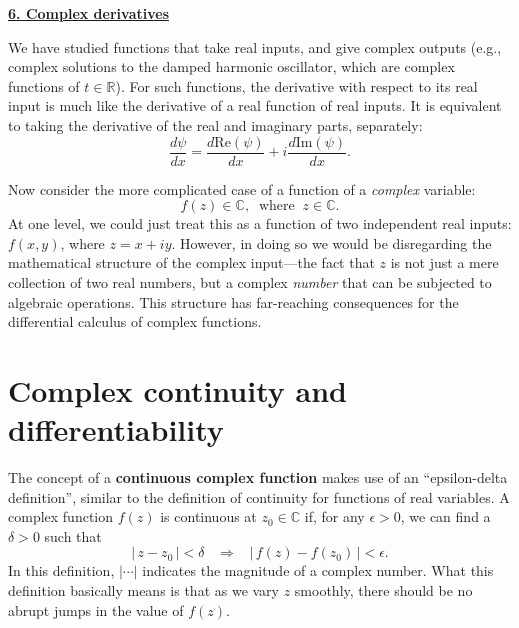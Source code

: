 \documentclass[10pt,a4paper]{article}
\begin{document}
\setcounter{page}{38}
\noindent
\underline{\textbf{\LARGE 6. Complex derivatives}}
\vskip 0.1in

We have studied functions that take real inputs, and give complex
outputs (e.g., complex solutions to the damped harmonic oscillator,
which are complex functions of $t \in \mathbb{R}$). For such
functions, the derivative with respect to its real input is much like
the derivative of a real function of real inputs.  It is equivalent to
taking the derivative of the real and imaginary parts, separately:
\begin{equation}
  \frac{d\psi}{dx}
  = \frac{d\mathrm{Re}(\psi)}{dx} + i \frac{d\mathrm{Im}(\psi)}{dx}.
\end{equation}

Now consider the more complicated case of a function of a
\emph{complex} variable:
\begin{equation}
  f(z) \in \mathbb{C}, \;\;\mathrm{where}\;\; z \in \mathbb{C}.
\end{equation}
At one level, we could just treat this as a function of two
independent real inputs: $f(x,y)$, where $z = x + i y$. However, in
doing so we would be disregarding the mathematical structure of the
complex input---the fact that $z$ is not just a mere collection of two
real numbers, but a complex \emph{number} that can be subjected to
algebraic operations. This structure has far-reaching consequences for
the differential calculus of complex functions.

\section{Complex continuity and differentiability}
\label{complex-continuity-and-differentiability}

The concept of a \textbf{continuous complex function} makes use of an
``epsilon-delta definition'', similar to the definition of continuity
for functions of real variables. A complex function $f(z)$ is
continuous at $z_0 \in \mathbb{C}$ if, for any $\epsilon > 0$, we can
find a $\delta > 0$ such that
\begin{equation}
  \big|\, z - z_0 \,\big| < \delta \;\;\; \Rightarrow
  \;\;\; \big|\, f(z) - f(z_0) \,\big| < \epsilon.
\end{equation}
In this definition, $\big|\cdots\big|$ indicates the magnitude of a
complex number.  What this definition basically means is that as we
vary $z$ smoothly, there should be no abrupt jumps in the value of
$f(z)$.
\end{document}

